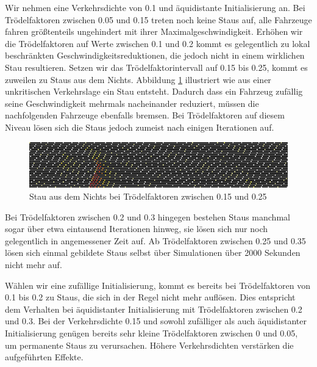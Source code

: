 \documentclass[10pt, a4paper]{article}
\begin{document}
Wir nehmen eine Verkehrsdichte von 0.1 und äquidistante Initialisierung an. Bei Trödelfaktoren zwischen 0.05 und 0.15 treten noch keine Staus auf, alle Fahrzeuge fahren größtenteils ungehindert mit ihrer Maximalgeschwindigkeit. Erhöhen wir die Trödelfaktoren auf Werte zwischen 0.1 und 0.2 kommt es gelegentlich zu lokal beschränkten Geschwindigkeitsreduktionen, die jedoch nicht in einem wirklichen Stau resultieren. Setzen wir das Trödelfaktorintervall auf 0.15 bis 0.25, kommt es zuweilen zu Staus aus dem Nichts. Abbildung \ref{fig:ergStauAusDemNichtsP0_2} illustriert wie aus einer unkritischen Verkehrslage ein Stau entsteht. Dadurch dass ein Fahrzeug zufällig seine Geschwindigkeit mehrmals nacheinander reduziert, müssen die nachfolgenden Fahrzeuge ebenfalls bremsen. Bei Trödelfaktoren auf diesem Niveau lösen sich die Staus jedoch zumeist nach einigen Iterationen auf.

\begin{figure}[h!]
	\centering
	\includegraphics[width=\textwidth]{img/erg_einspurig_stau_aus_dem_nichts_dichte_0_1_p_0_15_bis_0_25}
	\caption{Stau aus dem Nichts bei Trödelfaktoren zwischen 0.15 und 0.25}
	\label{fig:ergStauAusDemNichtsP0_2}
\end{figure}

Bei Trödelfaktoren zwischen 0.2 und 0.3 hingegen bestehen Staus manchmal sogar über etwa eintausend Iterationen hinweg, sie lösen sich nur noch gelegentlich in angemessener Zeit auf. Ab Trödelfaktoren zwischen 0.25 und 0.35 lösen sich einmal gebildete Staus selbst über Simulationen über 2000 Sekunden nicht mehr auf. %

Wählen wir eine zufällige Initialisierung, kommt es bereits bei Trödelfaktoren von 0.1 bis 0.2 zu Staus, die sich in der Regel nicht mehr auflösen. Dies entspricht dem Verhalten bei äquidistanter Initialisierung mit Trödelfaktoren zwischen 0.2 und 0.3.
Bei der Verkehrsdichte 0.15 und sowohl zufälliger als auch äquidistanter Initialisierung genügen bereits sehr kleine Trödelfaktoren zwischen 0 und 0.05, um permanente Staus zu verursachen. Höhere Verkehrsdichten verstärken die aufgeführten Effekte.
\end{document}

